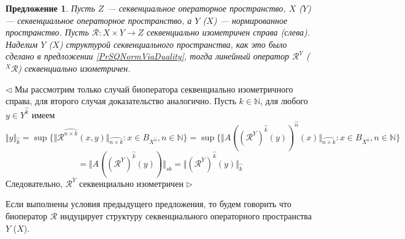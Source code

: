 \documentclass[12pt]{article}
\newtheorem{proposition}[theorem]{Предложение}
\newenvironment{proof}{\par $\triangleleft$}{$\triangleright$}
\begin{document}
\begin{proposition}\label{PrFreezIsomSQIsom}
Пусть $Z$ --- секвенциальное операторное пространство, $X$ ($Y$) --- секвенциальное операторное пространство, а $Y$ ($X$) --- нормированное пространство. Пусть $\mathcal{R}:X\times Y\to Z$ секвенциально изометричен справа (слева). Наделим $Y$ ($X$) структурой секвенциального пространства, как это было сделано в предложении \ref{PrSQNormViaDuality}, тогда линейный 
оператор $\mathcal{R}^Y$ (${}^X\mathcal{R}$) секвенциально изометричен.
\end{proposition}
\begin{proof}
Мы рассмотрим только случай биоператора секвенциально изометричного справа, для второго случая доказательство аналогично. Пусть $k\in\mathbb{N}$, для любого $y\in Y^{\wideparen{k}}$ имеем
$$
\Vert y\Vert_{\wideparen{k}}
=\sup\{\Vert\mathcal{R}^{\wideparen{n\times k}}(x,y)\Vert_{\wideparen{n\times k}}:x\in B_{X^{\wideparen{n}}}, n\in\mathbb{N}\}
=\sup\{\Vert A((\mathcal{R}^Y)^{\wideparen{k}}(y))^{\wideparen{n}}(x)\Vert_{\wideparen{n\times k}}:x\in B_{X^{\wideparen{n}}}, n\in\mathbb{N}\}
$$
$$
=\Vert A((\mathcal{R}^Y)^{\wideparen{k}}(y))\Vert_{sb}
=\Vert (\mathcal{R}^Y)^{\wideparen{k}}(y)\Vert_{\wideparen{k}}
$$
Следовательно, $\mathcal{R}^Y$ секвенциально изометричен
\end{proof}

Если выполнены условия предыдущего предложения, то будем говорить что биоператор $\mathcal{R}$ индуцирует структуру секвенциального операторного пространства $Y$ ($X$).
\end{document}
